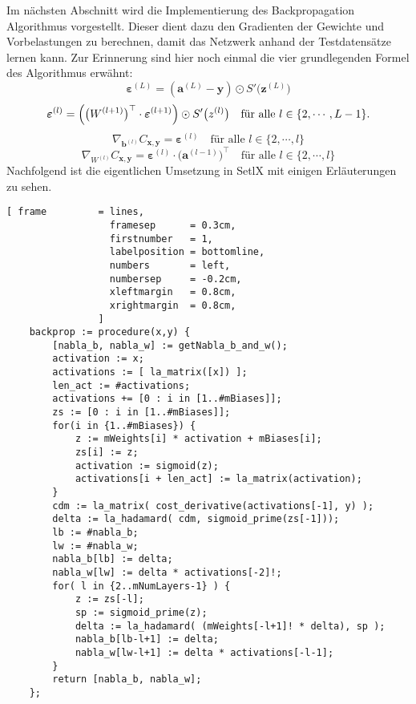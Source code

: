 \noindent
Im nächsten Abschnitt wird die Implementierung des Backpropagation Algorithmus vorgestellt. Dieser dient dazu den Gradienten der Gewichte und Vorbelastungen zu berechnen, damit das Netzwerk anhand der Testdatensätze lernen kann. Zur Erinnerung sind hier noch einmal die vier grundlegenden Formel des Algorithmus erwähnt:
\begin{equation} \label{eq:BP1_impl}
	\boldsymbol{\varepsilon}^{(L)} = (\mathbf{a}^{(L)} - \mathbf{y}) \odot S'\bigl(\mathbf{z}^{(L)}\bigr)  
\end{equation}
\begin{equation} \label{eq:BP2_impl}
	\boldsymbol{\varepsilon}^{(l)} = \Bigl(\bigl(W^{(l+1)}\bigr)^\top \cdot \boldsymbol{\varepsilon}^{(l+1)}\Bigr) \odot
  S'\bigl(z^{(l)}\bigr) \quad \mbox{für alle $l \in \{2, \cdots, L-1\}$}.
\end{equation}
\begin{equation} \label{eq:BP3_impl}
	\nabla_{\mathbf{b}^{(l)}} C_{\mathbf{x}, \mathbf{y}} = \boldsymbol{\varepsilon}^{(l)}
  \quad \mbox{für alle $l \in \{2, \cdots,l\}$}
\end{equation}
\begin{equation} \label{eq:BP4_impl}
	\nabla_{W^{(l)}} C_{\mathbf{x}, \mathbf{y}} = \boldsymbol{\varepsilon}^{(l)} \cdot \bigl(\mathbf{a}^{(l-1)}\bigr)^\top
  \quad \mbox{für alle $l \in \{2, \cdots,l\}$}
\end{equation}
Nachfolgend ist die eigentlichen Umsetzung in SetlX mit einigen Erläuterungen zu sehen.
\begin{Verbatim}[ frame         = lines, 
                  framesep      = 0.3cm, 
                  firstnumber   = 1,
                  labelposition = bottomline,
                  numbers       = left,
                  numbersep     = -0.2cm,
                  xleftmargin   = 0.8cm,
                  xrightmargin  = 0.8cm,
                ]
    backprop := procedure(x,y) {
        [nabla_b, nabla_w] := getNabla_b_and_w();
        activation := x;
        activations := [ la_matrix([x]) ];
        len_act := #activations;
        activations += [0 : i in [1..#mBiases]];
        zs := [0 : i in [1..#mBiases]];		
        for(i in {1..#mBiases}) {
            z := mWeights[i] * activation + mBiases[i];
            zs[i] := z;	
            activation := sigmoid(z);
            activations[i + len_act] := la_matrix(activation);
        }
        cdm := la_matrix( cost_derivative(activations[-1], y) );
        delta := la_hadamard( cdm, sigmoid_prime(zs[-1]));
        lb := #nabla_b;
        lw := #nabla_w;
        nabla_b[lb] := delta;	
        nabla_w[lw] := delta * activations[-2]!;				
        for( l in {2..mNumLayers-1} ) {
            z := zs[-l];
            sp := sigmoid_prime(z);	
            delta := la_hadamard( (mWeights[-l+1]! * delta), sp );
            nabla_b[lb-l+1] := delta;
            nabla_w[lw-l+1] := delta * activations[-l-1];
        }
        return [nabla_b, nabla_w];
    };
\end{Verbatim}
